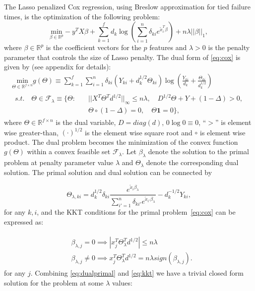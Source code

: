 The Lasso penalized Cox regression, using Breslow approximation \citep{breslow1974covariance} for tied failure times, is the optimization of the following problem:
\begin{equation}
    \label{eq:cox}
    \underset{\beta\in \mathbb{R}^p}{\mathrm{min}}-y^TX\beta+\sum_{k=1}^f d_k\log\left(\sum_{i=1}^n \delta_{ki} e^{\tilde{x}_i^T\beta}\right)+n\lambda||\beta||_1,
\end{equation}
where $\beta\in\mathbb{R}^p$ is the coefficient vectors for the $p$ features and $\lambda>0$ is the penalty parameter that controls the size of Lasso penalty. The dual form of \eqref{eq:cox} is given by (see appendix for details):
\begin{gather}
        \label{eq:dualTheta}
        \underset{\Theta\in \mathbb{R}^{f\times n}}{\mathrm{min}}g(\Theta)\equiv\sum_{k=1}^f\sum_{i=1}^n\delta_{ki}(Y_{ki}+d_k^{1/2}\Theta_{ki})\log\left(\frac{Y_{ki}}{d_k}+\frac{\Theta_{ki}}{d_k^{1/2}}\right)\\
        \begin{aligned}s.t.\quad \Theta\in \mathcal{F}_\lambda\equiv\{\Theta:\quad
            &||X^T\Theta^Td^{1/2}||_\infty\leq n\lambda,\quad D^{1/2}\Theta+Y+(1-\Delta)> 0,\\& \Theta\circ(1-\Delta)=0,\quad \Theta\mathbf{1}=0\}\nonumber,
        \end{aligned}
\end{gather}
where $\Theta\in \mathbb{R}^{f\times n}$ is the dual variable, $D=diag(d)$, $0\log 0\equiv0$, ``$>$'' is element wise greater-than, $(\cdot)^{1/2}$ is the element wise square root and $\circ$ is element wise product. The dual problem becomes the minimization of the convex function $g(\Theta)$ within a convex feasible set $\mathcal{F}_\lambda$. Let $\beta_\lambda$ denote the solution to the primal problem at penalty parameter value $\lambda$ and $\Theta_{\lambda}$ denote the corresponding dual solution. The primal solution and dual solution can be connected by

\begin{equation}
    \label{eq:dualprimal}
    \Theta_{\lambda,ki}=d_k^{1/2}\delta_{ki}\frac{e^{\tilde{x}_i\beta_\lambda}}{\sum_{i'=1}^n\delta_{ki'}e^{\tilde{x}_{i'}\beta_\lambda}}-d_k^{-1/2}Y_{ki},
\end{equation}
for any $k,i$, and the KKT conditions for the primal problem~\eqref{eq:cox} can be expressed as:

\begin{gather}
    \label{eq:kkt}
    \begin{aligned}&\beta_{\lambda,j}=0\implies\left|x_j^T\Theta_\lambda^Td^{1/2}\right|\leq n\lambda\\
    & \beta_{\lambda,j}\neq0\implies x_j^T\Theta_\lambda^Td^{1/2}= n\lambda\textit{sign}(\beta_{\lambda,j}).
    \end{aligned}
\end{gather}
for any $j$. Combining \eqref{eq:dualprimal} and \eqref{eq:kkt} we have a trivial closed form solution for the problem at some $\lambda$ values:

